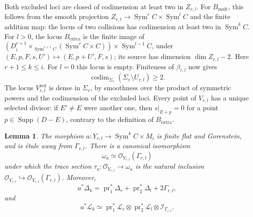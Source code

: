 \documentclass[11pt,letterpaper]{amsart}
\theoremstyle{plain}
\newtheorem{lemma}[theorem]{Lemma}
\theoremstyle{definition}
\theoremstyle{remark}
\numberwithin{equation}{section}
\DeclareMathOperator{\Sym}{Sym}
\DeclareMathOperator{\Supp}{Supp}
\newcommand{\scrL}{\mathscr L}
\begin{document}
Both excluded loci are closed of codimension at least two in $Z_{r,l}$.
For $B_{\mathrm{mult}}$, this follows from the smooth projection
$Z_{r,l}\to\Sym^rC\times\Sym^lC$ and the finite addition map: the
locus of two collisions has codimension at least two in $\Sym^kC$.
For $l>0$, the locus $B_{\mathrm{extra}}$ is the finite image of
$
 \left(D_i^{r+1}\times_{\Sym^{r+1}C}
       (\Sym^rC\times C)\right)\times\Sym^{l-1}C$,
under $(E,p,F,s,U')\mapsto(E,p+U',F,s)$; its source has dimension
$\dim Z_{r,l}-2$. Here $r+1\le k\le i$. For $l=0$ this locus is
empty. Finiteness of $\beta_{r,l}$ now gives
\begin{equation}\label{eq:bigopen}
 \operatorname{codim}_{\Sigma_r}(\Sigma_r\setminus U_{r,l})\ge2.
\end{equation}
The locus $V_{r,l}^{\mathrm{red}}$ is dense in $\Sigma_r$, by
smoothness over the product of symmetric powers and the
codimension of the excluded loci. Every point of $V_{r,l}$ has a unique selected divisor:
if $E'\ne E$ were another one, then $s|_{E+p}=0$ for a point
$p\in\Supp(D-E)$, contrary to the definition of $B_{\mathrm{extra}}$.

\begin{lemma}\label{lem:addition-duality}
The morphism $a:Y_{r,l}\longrightarrow {\Sym^kC\times M_i}$ is finite flat and Gorenstein, and is \'etale away
from $\Gamma_{r,l}$.  There is a canonical isomorphism
\begin{equation}\label{eq:omega-addition}
 \omega_a\simeq\mathcal O_{Y_{r,l}}(\Gamma_{r,l})
\end{equation}
under which the trace section
$\tau_a:\mathcal O_{Y_{r,l}}\to\omega_a$ is the natural inclusion
$\mathcal O_{Y_{r,l}}\hookrightarrow\mathcal O_{Y_{r,l}}(\Gamma_{r,l})$.
Moreover,
\begin{equation}\label{eq:discriminant-factor}
 a^*\Delta_k=\operatorname{pr}_1^*\Delta_r+
             \operatorname{pr}_2^*\Delta_l+2\Gamma_{r,l},
\end{equation}
and
\begin{equation}\label{eq:signline-addition}
 a^*\scrL_k\simeq\operatorname{pr}_1^*\scrL_r\otimes
                    \operatorname{pr}_2^*\scrL_l\otimes
                    \mathcal I_{\Gamma_{r,l}}.
\end{equation}
\end{lemma}
\end{document}
